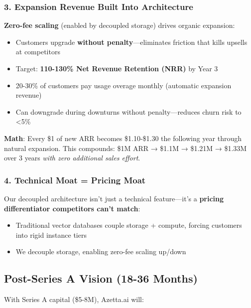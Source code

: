 \subsubsection{3. Expansion Revenue Built Into Architecture}

\textbf{Zero-fee scaling} (enabled by decoupled storage) drives organic expansion:

\begin{itemize}[noitemsep]
    \item Customers upgrade \textbf{without penalty}—eliminates friction that kills upsells at competitors
    \item Target: \textbf{110-130\% Net Revenue Retention (NRR)} by Year 3
    \item 20-30\% of customers pay usage overage monthly (automatic expansion revenue)
    \item Can downgrade during downturns without penalty—reduces churn risk to <5\%
\end{itemize}

\textbf{Math}: Every \$1 of new ARR becomes \$1.10-\$1.30 the following year through natural expansion. This compounds: \$1M ARR → \$1.1M → \$1.21M → \$1.33M over 3 years \textit{with zero additional sales effort}.

\subsubsection{4. Technical Moat = Pricing Moat}

Our decoupled architecture isn't just a technical feature—it's a \textbf{pricing differentiator competitors can't match}:

\begin{itemize}[noitemsep]
    \item Traditional vector databases couple storage + compute, forcing customers into rigid instance tiers
    \item We decouple storage, enabling zero-fee scaling up/down
\end{itemize}
\vspace{0.3cm}

\subsection{Post-Series A Vision (18-36 Months)}

With Series A capital (\$5-8M), Azetta.ai will:


